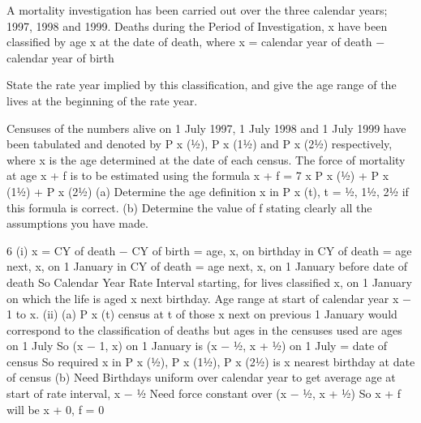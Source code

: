 \documentclass[a4paper,1pt]{article}
\begin{document}
A mortality investigation has been carried out over the three calendar years;
1997, 1998 and 1999.
Deaths during the Period of Investigation, \theta x have been classified by age x at the
date of death, where
x = calendar year of death − calendar year of birth
\item  State the rate year implied by this classification, and give the age range of
the lives at the beginning of the rate year.

\item  Censuses of the numbers alive on 1 July 1997, 1 July 1998 and 1 July
1999 have been tabulated and denoted by P x (1⁄2), P x (11⁄2) and P x (21⁄2)
respectively, where x is the age determined at the date of each census.
The force of mortality at age x + f is to be estimated using the formula
\hat{\mu} x + f =
7
\theta x
P x (1⁄2) + P x (11⁄2) + P x (21⁄2)
(a) Determine the age definition x in P x (t), t = 1⁄2, 11⁄2, 21⁄2 if this
formula is correct.
(b) Determine the value of f stating clearly all the assumptions you
have made.

6
(i)
x = CY of death − CY of birth
= age, x, on birthday in CY of death
= age next, x, on 1 January in CY of death
= age next, x, on 1 January before date of death
So Calendar Year Rate Interval starting, for lives classified x, on
1 January on which the life is aged x next birthday.
Age range at start of calendar year x − 1 to x.
(ii)
(a)
P x (t) census at t of those x next on previous 1 January would
correspond to the classification of deaths
but ages in the censuses used are ages on 1 July
So (x − 1, x) on 1 January
is (x − 1⁄2, x + 1⁄2) on 1 July = date of census
So required x in P x (1⁄2), P x (11⁄2), P x (21⁄2) is x nearest birthday at date
of census
(b)
Need Birthdays uniform over calendar year
to get average age at start of rate interval, x − 1⁄2
Need force constant over (x − 1⁄2, x + 1⁄2)
So \hat{\mu} x + f will be x + 0, f = 0
\end{document}
